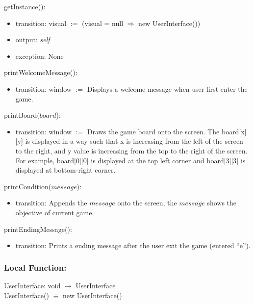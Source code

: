\documentclass[12pt]{article}
\begin{document}
\noindent getInstance():
\begin{itemize}
  \item transition: visual $:=$ (visual = null $\Rightarrow$ new UserInterface())
  \item output: \textit{self}
  \item exception: None
\end{itemize}

\noindent printWelcomeMessage():
\begin{itemize}
\item transition: window $:=$ Displays a welcome message when user first enter the game.
\end{itemize}

\noindent printBoard($board$):
\begin{itemize}
\item transition: window $:=$ Draws the game board onto the screen. The board[x][y] is displayed 
                  in a way such that x is increasing from the left of the screen to the right,
                  and y value is increasing from the top to the right of the screen. For example,
                  board[0][0] is displayed at the top left corner and board[3][3] is displayed 
                  at bottom-right corner. 
\end{itemize}

\noindent printCondition($message$):
\begin{itemize}
\item transition: Appends the $message$ onto the screen, the $message$ shows the objective of current game.
\end{itemize}

\noindent printEndingMessage():
\begin{itemize}
\item transition: Prints a ending message after the user exit the game (entered ``e'').
\end{itemize}

\subsubsection*{Local Function:}

UserInterface: void $\rightarrow$ UserInterface \\
UserInterface() $\equiv$ new UserInterface()
\end{document}
